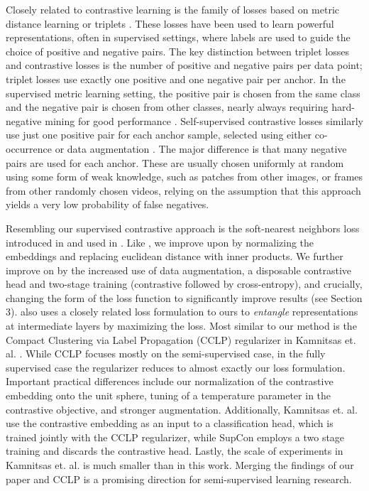 Closely related to contrastive learning is the family of losses based on metric distance learning or triplets \cite{chopra2005learning,weinberger2009distance,schroff2015facenet}. These losses have been used to learn powerful representations, often in supervised settings, where labels are used to guide the choice of positive and negative pairs. The key distinction between triplet losses and contrastive losses is the number of positive and negative pairs per data point; triplet losses use exactly one positive and one negative pair per anchor. In the supervised metric learning setting, the positive pair is chosen from the same class and the negative pair is chosen from other classes, nearly always requiring hard-negative mining for good performance \cite{schroff2015facenet}. Self-supervised contrastive losses similarly use just one positive pair for each anchor sample, selected using either co-occurrence \cite{henaff2019data,hjelm2018learning,tian2019contrastive} or data augmentation \cite{chen2020simple}. The major difference is that many negative pairs are used for each anchor. These are usually chosen uniformly at random using some form of weak knowledge, such as patches from other images, or frames from other randomly chosen videos, relying on the assumption that this approach yields a very low probability of false negatives.

 Resembling our supervised contrastive approach is the soft-nearest neighbors loss introduced in  \cite{salakhutdinov2007learning} and used in \cite{wu2018improving}. Like \cite{wu2018improving}, we improve upon \cite{salakhutdinov2007learning} by normalizing the embeddings and replacing euclidean distance with inner products. We further improve on \cite{wu2018improving} by the increased use of data augmentation, a disposable contrastive head and two-stage training (contrastive followed by cross-entropy), and crucially, changing the form of the loss function to significantly improve results (see Section 3). \cite{frosst2019analyzing} also uses a closely related loss formulation to ours to \textit{entangle} representations at intermediate layers by maximizing the loss. Most similar to our method is the Compact Clustering via Label Propagation (CCLP) regularizer in Kamnitsas et. al. \cite{Kamnitsas2018SemiSupervisedLV}. While CCLP focuses mostly on the semi-supervised case, in the fully supervised case the regularizer reduces to almost exactly our loss formulation. Important practical differences include our normalization of the contrastive embedding onto the unit sphere, tuning of a temperature parameter in the contrastive objective, and stronger augmentation. Additionally, Kamnitsas et. al. use the contrastive embedding as an input to a classification head, which is trained jointly with the CCLP regularizer, while SupCon employs a two stage training and discards the contrastive head. Lastly, the scale of experiments in Kamnitsas et. al. is much smaller than in this work. Merging the findings of our paper and CCLP is a promising direction for semi-supervised learning research. 

